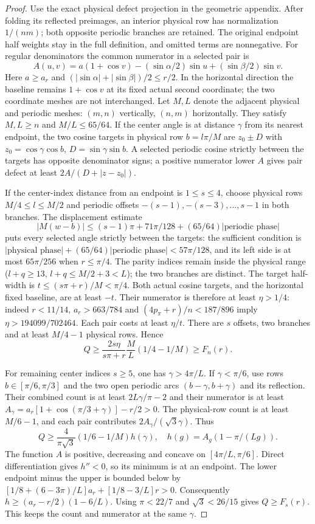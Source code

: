 \begin{proof}
Use the exact physical defect projection in the geometric appendix.
After folding its reflected preimages, an interior physical row has
normalization $1/(nm)$; both opposite periodic branches are retained.
The original endpoint half weights stay in the full definition, and
omitted terms are nonnegative. For regular denominators the common
numerator in a selected pair is
\[
 A(u,v)=a(1+\cos v)-(\sin\alpha/2)\sin u
                         +(\sin\beta/2)\sin v.
\]
Here $a\geq a_r$ and
$(|\sin\alpha|+|\sin\beta|)/2\leq r/2$. In the horizontal direction
the baseline remains $1+\cos v$ at its fixed actual second coordinate;
the two coordinate meshes are not interchanged.
Let $M,L$ denote the adjacent physical and periodic meshes:
$(m,n)$ vertically, $(n,m)$ horizontally. They satisfy $M,L\geq n$
and $M/L\leq65/64$. If the center angle is at distance $\gamma$
from its nearest endpoint, the two cosine targets in physical row
$b=l\pi/M$ are $z_0\pm D$ with
$z_0=\cos\gamma\cos b$, $D=\sin\gamma\sin b$.
A selected periodic cosine strictly between the targets has opposite
denominator signs; a positive numerator lower $A$ gives pair defect
at least $2A/(D+|z-z_0|)$.

If the center-index distance from an endpoint is $1\leq s\leq4$,
choose physical rows $M/4\leq l\leq M/2$ and periodic offsets
$-(s-1),-(s-3),\ldots,s-1$ in both branches. The displacement estimate
\[
 |M(w-b)|\leq(s-1)\pi+71\pi/128
                         +(65/64)|\text{periodic phase}|
\]
puts every selected angle strictly between the targets: the sufficient
condition is
$|\text{physical phase}|+(65/64)|\text{periodic phase}|<57\pi/128$,
and its left side is at most $65\pi/256$ when $r\leq\pi/4$.
The parity indices remain inside the physical range
($l+q\geq13$, $l+q\leq M/2+3<L$); the two branches are distinct.
The target half-width is $t\leq(s\pi+r)/M<\pi/4$.
Both actual cosine targets, and the horizontal fixed baseline,
are at least $-t$. Their numerator is therefore at least $\eta>1/4$:
indeed $r<11/14$, $a_r>663/784$ and
$(4p_\pi+r)/n<187/896$ imply
$\eta>194099/702464$.
Each pair costs at least $\eta/t$. There are $s$ offsets, two
branches and at least $M/4-1$ physical rows. Hence
\[
 Q\geq\frac{2s\eta}{s\pi+r}\frac ML(1/4-1/M)\geq F_n(r).
\]

For remaining center indices $s\geq5$, one has $\gamma>4\pi/L$.
If $\gamma<\pi/6$, use rows $b\in[\pi/6,\pi/3]$ and the two open
periodic arcs $(b-\gamma,b+\gamma)$ and its reflection. Their combined
count is at least $2L\gamma/\pi-2$ and their numerator is at least
$A_\gamma=a_r[1+\cos(\pi/3+\gamma)]-r/2>0$.
The physical-row count is at least $M/6-1$, and each pair contributes
$2A_\gamma/(\sqrt3\gamma)$. Thus
\[
 Q\geq\frac4{\pi\sqrt3}(1/6-1/M)h(\gamma),\quad
 h(g)=A_g(1-\pi/(Lg)).
\]
The function $A$ is positive, decreasing and concave on
$[4\pi/L,\pi/6]$. Direct differentiation gives $h''<0$,
so its minimum is at an endpoint. The lower endpoint minus the upper
is bounded below by
$[1/8+(6-3\pi)/L]a_r+[1/8-3/L]r>0$.
Consequently $h\geq(a_r-r/2)(1-6/L)$.
Using $\pi<22/7$ and $\sqrt3<26/15$ gives $Q\geq F_s(r)$.
This keeps the count and numerator at the same $\gamma$.


\end{proof}
